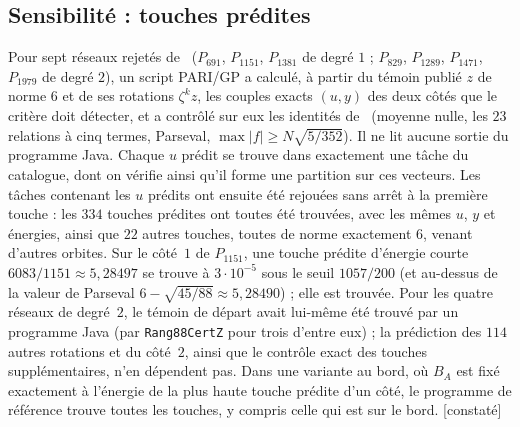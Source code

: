 \documentclass[11pt,a4paper]{amsart}
\theoremstyle{plain}
\theoremstyle{definition}
\newcommand{\st}[1]{\textup{\textsf{\small[#1]}}}
\newcommand{\CONS}{\st{constaté}}
\begin{document}
\subsection{Sensibilité : touches prédites}
Pour sept réseaux rejetés de~\cite[tableau~2]{Gau26} ($P_{691}$, $P_{1151}$, $P_{1381}$ de degré $1$ ; $P_{829}$, $P_{1289}$, $P_{1471}$, $P_{1979}$ de degré $2$), un script PARI/GP a calculé, à partir du témoin publié $z$ de norme $6$ et de ses rotations $\zeta^kz$, les couples exacts $(u,y)$ des deux côtés que le critère doit détecter, et a contrôlé sur eux les identités de~\cite[\S4]{Gau26} (moyenne nulle, les $23$ relations à cinq termes, Parseval, $\max|f|\ge N\sqrt{5/352}$). Il ne lit aucune sortie du programme Java. Chaque $u$ prédit se trouve dans exactement une tâche du catalogue, dont on vérifie ainsi qu'il forme une partition sur ces vecteurs. Les tâches contenant les $u$ prédits ont ensuite été rejouées sans arrêt à la première touche : les $334$ touches prédites ont toutes été trouvées, avec les mêmes $u$, $y$ et énergies, ainsi que $22$ autres touches, toutes de norme exactement $6$, venant d'autres orbites. Sur le côté~$1$ de $P_{1151}$, une touche prédite d'énergie courte $6083/1151\approx5{,}28497$ se trouve à $3\cdot10^{-5}$ sous le seuil $1057/200$ (et au-dessus de la valeur de Parseval $6-\sqrt{45/88}\approx5{,}28490$) ; elle est trouvée. Pour les quatre réseaux de degré~$2$, le témoin de départ avait lui-même été trouvé par un programme Java (par \texttt{Rang88CertZ} pour trois d'entre eux) ; la prédiction des $114$ autres rotations et du côté~$2$, ainsi que le contrôle exact des touches supplémentaires, n'en dépendent pas. Dans une variante au bord, où $B_A$ est fixé exactement à l'énergie de la plus haute touche prédite d'un côté, le programme de référence trouve toutes les touches, y compris celle qui est sur le bord. \CONS
\end{document}
